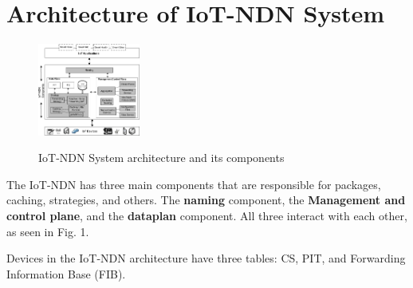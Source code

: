 \documentclass[conference]{IEEEtran}
\begin{document}
\section{Architecture of IoT-NDN System}

\begin{figure}[h]
    \centering
    \includegraphics[width=0.3\textwidth]{IoT-NDN_System_architecture_and_its_components.png}\\
    \caption{IoT-NDN System architecture and its components}
    \label{fig:enter-label}
\end{figure}

The IoT-NDN has three main components that are responsible for packages, caching, strategies, and others.
The \textbf{naming} component, the \textbf{Management and control plane}, and the \textbf{dataplan} component. All three interact with each other, as seen in Fig. 1.

Devices in the IoT-NDN architecture have three tables: CS, PIT, and Forwarding Information Base (FIB).





\end{document}

